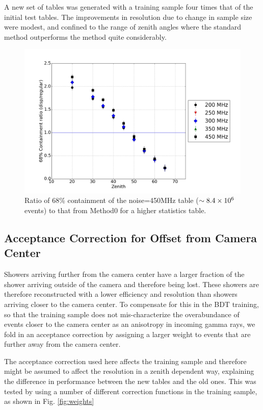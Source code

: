 \documentclass[main.tex]{subfiles}
\begin{document}
A new set of \disp tables was generated with a training sample four times that of the initial test tables. The improvements in resolution due to change in sample size were modest, and confined to the range of zenith angles where the standard method outperforms the \disp method quite considerably.

\begin{figure}[htbp]
  \centering
  \includegraphics[width=0.8\linewidth]{images/disp_450x4size_ratio_xzen}
  \caption[Higher statistics \disp table reconstruction vs noise.]{Ratio of 68\% containment of the noise=450MHz \disp table ($\sim 8.4\times 10^{6}$ events) to that from Method0 for a higher statistics \disp table.}
  \label{fig:disp_ratio_450x4}
\end{figure}

\subsection{Acceptance Correction for Offset from Camera Center}
Showers arriving further from the camera center have a larger fraction of the shower arriving outside of the camera and therefore being lost. These showers are therefore reconstructed with a lower efficiency and resolution than showers arriving closer to the camera center. To compensate for this in the BDT training, so that the training sample does not mis-characterize the overabundance of events closer to the camera center as an anisotropy in incoming gamma rays, we fold in an acceptance correction by assigning a larger weight to events that are further away from the camera center.

The acceptance correction used here affects the training sample and therefore might be assumed to affect the resolution in a zenith dependent way, explaining the difference in performance between the new \disp tables and the old ones. This was tested by using a number of different correction functions in the training sample, as shown in Fig. \ref{fig:weights}
\end{document}
